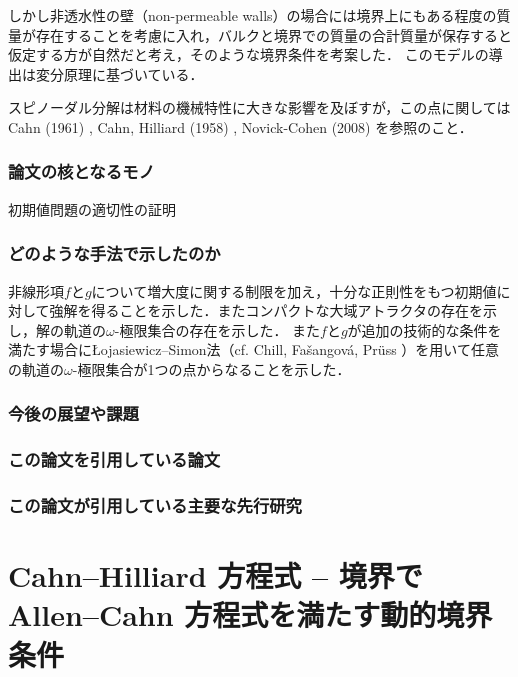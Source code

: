 \documentclass[openary, a4paper, oneside]{jsarticle}
\begin{document}
	しかし非透水性の壁（non-permeable walls）の場合には境界上にもある程度の質量が存在することを考慮に入れ，バルクと境界での質量の合計質量が保存すると仮定する方が自然だと考え，そのような境界条件を考案した．
	このモデルの導出は変分原理に基づいている．

	スピノーダル分解は材料の機械特性に大きな影響を及ぼすが，この点に関しては Cahn (1961) \cite{Cahn1961}, Cahn, Hilliard (1958) \cite{CahnHilliard1958}, Novick-Cohen (2008) \cite{NovickCohen2008} を参照のこと．
	\subsubsection{論文の核となるモノ}
	初期値問題の適切性の証明
	\subsubsection{どのような手法で示したのか}
	非線形項$f$と$g$について増大度に関する制限を加え，十分な正則性をもつ初期値に対して強解を得ることを示した．またコンパクトな大域アトラクタの存在を示し，解の軌道の$\omega$-極限集合の存在を示した．
	また$f$と$g$が追加の技術的な条件を満たす場合に{\L}ojasiewicz--Simon法（cf. Chill, Fa\v{s}angov\'a, Pr\"uss \cite{ChillFasangovaPruss2006}）を用いて任意の軌道の$\omega$-極限集合が1つの点からなることを示した．
	\subsubsection{今後の展望や課題}
	\subsubsection{この論文を引用している論文}
	\subsubsection{この論文が引用している主要な先行研究}


\newpage

\section{Cahn--Hilliard 方程式 -- 境界で Allen--Cahn 方程式を満たす動的境界条件}
\end{document}
